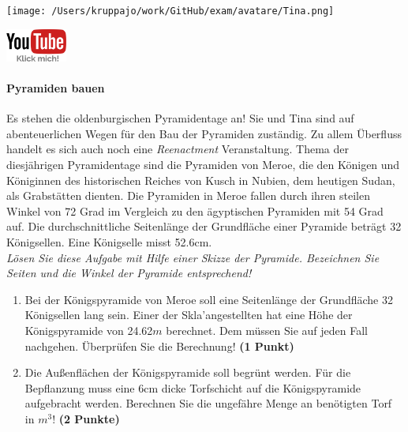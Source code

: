 \documentclass[a4paper, 9pt]{scrartcl}\usepackage[]{graphicx}\usepackage[]{xcolor}
\begin{document}
 
\ifcollection
\begin{flushright}
\tiny\vspace{-3Ex}
\textbf{\examinhaltstart}
\exammodulemathstat
\vspace{-4Ex}
\end{flushright}
\begin{minipage}[t]{0.5\textwidth}
\texttt{[image: /Users/kruppajo/work/GitHub/exam/avatare/Tina.png]}
\end{minipage}
\begin{minipage}[t]{0.5\textwidth}
\hfill
\href{https://youtu.be/tDgr6fpkkYA}{\includegraphics[width = 2cm]{img/youtube}}
\end{minipage}
\fi



\ifcollection
\paragraph{Pyramiden bauen}
\fi



Es stehen die oldenburgischen Pyramidentage an! Sie und Tina sind auf abenteuerlichen Wegen für den Bau der Pyramiden zuständig. Zu allem Überfluss handelt es sich auch noch eine \textit{Reenactment} Veranstaltung. Thema der diesjährigen Pyramidentage sind die Pyramiden von Meroe, die den Königen und Königinnen des historischen Reiches von Kusch in Nubien, dem heutigen Sudan, als Grabstätten dienten. Die Pyramiden in Meroe fallen durch ihren steilen Winkel von 72 Grad im Vergleich zu den ägyptischen Pyramiden mit 54 Grad auf. Die durchschnittliche Seitenlänge der Grundfläche einer Pyramide beträgt 32 Königsellen. Eine Königselle misst 52.6cm.\\

\textit{Lösen Sie diese Aufgabe mit Hilfe einer Skizze der Pyramide. Bezeichnen Sie Seiten und die Winkel der Pyramide entsprechend!}

\begin{enumerate}
\item Bei der Königspyramide von Meroe soll eine Seitenlänge der Grundfläche 32 Königsellen lang sein. Einer der Skla'angestellten hat eine Höhe der Königspyramide von 24.62$m$ berechnet. Dem müssen Sie auf jeden Fall nachgehen. Überprüfen Sie die Berechnung! \textbf{(1 Punkt)}
\item Die Außenflächen der Königspyramide soll begrünt werden. Für die Bepflanzung muss eine 6cm dicke Torfschicht auf die Königspyramide aufgebracht werden. Berechnen Sie die ungefähre Menge an benötigten Torf in $m^3$! \textbf{(2 Punkte)}
\end{enumerate}
\end{document}
